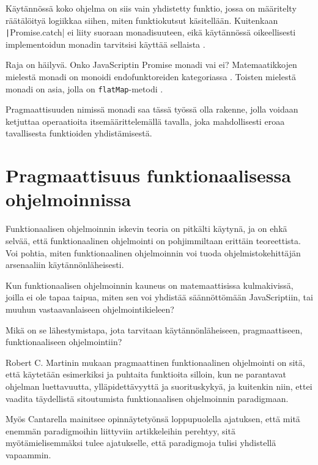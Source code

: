 Käytännössä koko ohjelma on siis vain yhdistetty funktio, jossa on määritelty räätälöityä logiikkaa siihen, miten funktiokutsut käsitellään. Kuitenkaan \texttt|Promise.catch| ei liity suoraan monadisuuteen, eikä käytännössä oikeellisesti implementoidun monadin tarvitsisi käyttää sellaista \cite{promises-spec-94}.

Raja on häilyvä. Onko JavaScriptin Promise monadi vai ei? Matemaatikkojen mielestä monadi on  monoidi endofunktoreiden kategoriassa \cite{bartosz_category_for_progamers_10,monad_wikipedia,stackoverflow_what_monad}. Toisten mielestä monadi on asia, jolla on \texttt{flatMap}-metodi \cite{stackoverflow_flatmap_monad}.

Pragmaattisuuden nimissä monadi saa tässä työssä olla rakenne, jolla voidaan ketjuttaa operaatioita itsemäärittelemällä tavalla, joka mahdollisesti eroaa tavallisesta funktioiden yhdistämisestä.


\section{Pragmaattisuus funktionaalisessa ohjelmoinnissa}

Funktionaalisen ohjelmoinnin iskevin teoria on pitkälti käytynä, ja on ehkä selvää, että funktionaalinen ohjelmointi on pohjimmiltaan erittäin teoreettista. Voi pohtia, miten funktionaalinen ohjelmoinnin voi tuoda ohjelmistokehittäjän arsenaaliin käytännönläheisesti.

Kun funktionaalisen ohjelmoinnin kauneus on matemaattisissa kulmakivissä, joilla ei ole tapaa taipua, miten sen voi yhdistää säännöttömään JavaScriptiin, tai muuhun vastaavanlaiseen ohjelmointikieleen?

Mikä on se lähestymistapa, jota tarvitaan käytännönläheiseen, pragmaattiseen, funktionaaliseen ohjelmointiin?

Robert C. Martinin mukaan pragmaattinen funktionaalinen ohjelmointi on sitä, että käytetään esimerkiksi  ja puhtaita funktioita silloin, kun ne parantavat ohjelman luettavuutta, ylläpidettävyyttä ja suorituskykyä, ja kuitenkin niin, ettei vaadita täydellistä sitoutumista funktionaalisen ohjelmoinnin paradigmaan. \citep{martin2017pragmaticfp}

Myös Cantarella mainitsee opinnäytetyönsä loppupuolella ajatuksen, että mitä enemmän paradigmoihin liittyviin artikkeleihin perehtyy, sitä myötämielisemmäksi tulee ajatukselle, että paradigmoja tulisi yhdistellä vapaammin. \citep[45]{cantarella_fp_haitat}

